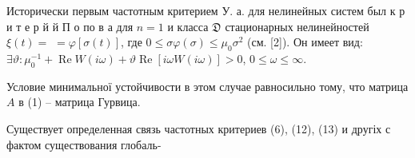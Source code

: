 \documentclass[10pt]{article}
\begin{document}
Исторически первым частотным критерием У. а. для нелинейных систем был к р и т е р й й П о по в а для $n=1$ и класса $\mathfrak{D}$ стационарных нелинейностей $\xi(t)=$ $=\varphi[\sigma(t)]$, где $0 \leqslant \sigma \varphi(\sigma) \leqslant \mu_{0} \sigma^{2}$ (см. [2]). Он имеет вид: $\exists \vartheta: \mu_{0}^{-1}+\operatorname{Re} W(i \omega)+\vartheta \operatorname{Re}[i \omega W(i \omega)]>0$, $0 \leqslant \omega \leqslant \infty$.



Условие минимальної устойчивости в этом случае равносильно тому, что матрица $A$ в (1) -- матрица Гурвица.



Существует определенная связь частотных критериев (6), (12), (13) и другіх с фактом существования глобаль-
\end{document}
